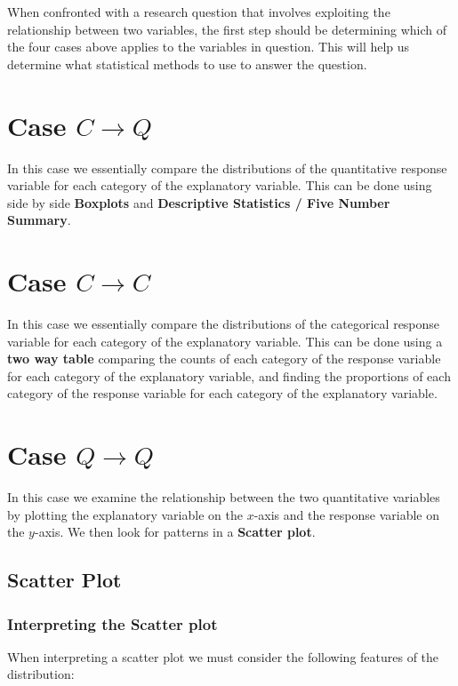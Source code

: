 \documentclass[12pt letter]{report}
\begin{document}
When confronted with a research question that involves exploiting the relationship between two variables, the first step
should be determining which of the four cases above applies to the variables in question. This will help us determine
what statistical methods to use to answer the question.

\section{Case $C \to Q$ }

In this case we essentially compare the distributions of the quantitative response variable for each category of the
explanatory variable. This can be done using side by side \textbf{Boxplots} and  \textbf{Descriptive Statistics / Five
	Number Summary}.


\section{Case $C \to C$ }

In this case we essentially compare the distributions of the categorical response variable for each category of the
explanatory variable. This can be done using a \textbf{two way table} comparing the counts of each category of the response
variable for each category of the explanatory variable, and finding the proportions of each category of the response variable for each category of the explanatory variable.

\section{Case $Q \to Q$}

In this case we examine the relationship between the two quantitative variables by plotting the explanatory variable on
the $x$-axis and the response variable on the $y$-axis. We then look for patterns in a \textbf{Scatter plot}.

\subsection{Scatter Plot}

\subsubsection{Interpreting the Scatter plot}

When interpreting a scatter plot we must consider the following features of the distribution:
\end{document}
